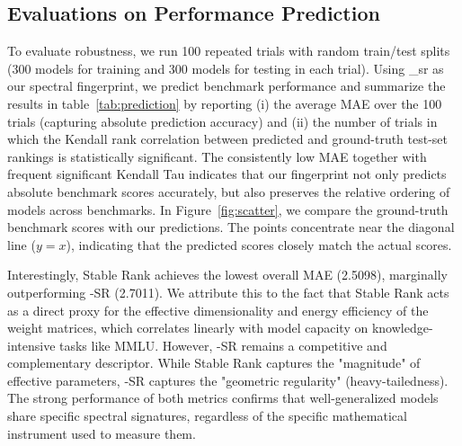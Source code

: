 \subsection{Evaluations on Performance Prediction}\label{sec:results_eval_performance}

To evaluate robustness, we run 100 repeated trials with random train/test splits (300 models for training and 300 models for testing in each trial). Using \ALPHAHILL\_sr as our spectral fingerprint, we predict benchmark performance and summarize the results in table~\ref{tab:prediction} by reporting (i) the average MAE over the 100 trials (capturing absolute prediction accuracy) and (ii) the number of trials in which the Kendall rank correlation between predicted and ground-truth test-set rankings is statistically significant. The consistently low MAE together with frequent significant Kendall Tau indicates that our fingerprint not only predicts absolute benchmark scores accurately, but also preserves the relative ordering of models across benchmarks. In Figure~\ref{fig:scatter}, we compare the ground-truth benchmark scores with our predictions. The points concentrate near the diagonal line ($y=x$), indicating that the predicted scores closely match the actual scores.

Interestingly, Stable Rank achieves the lowest overall MAE (2.5098), marginally outperforming \ALPHAHILL-SR (2.7011). We attribute this to the fact that Stable Rank acts as a direct proxy for the effective dimensionality and energy efficiency of the weight matrices, which correlates linearly with model capacity on knowledge-intensive tasks like MMLU. However, \ALPHAHILL-SR remains a competitive and complementary descriptor. While Stable Rank captures the "magnitude" of effective parameters, \ALPHAHILL-SR captures the "geometric regularity" (heavy-tailedness). The strong performance of both metrics confirms that well-generalized models share specific spectral signatures, regardless of the specific mathematical instrument used to measure them.

